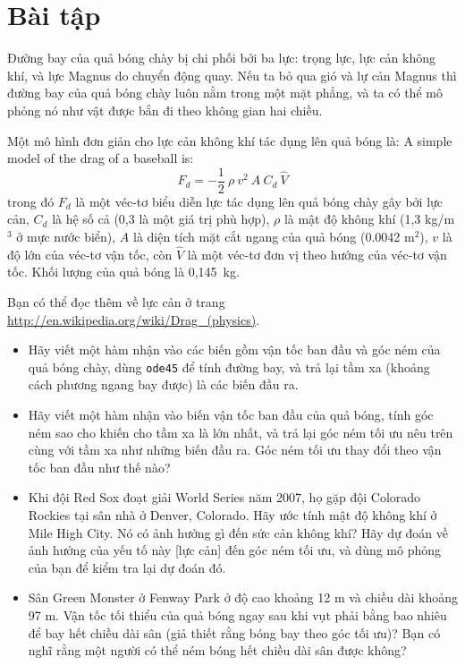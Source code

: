 \documentclass[12pt]{book}
\begin{document}
\section{Bài tập}

\begin{ex}
\label{baseball}

Đường bay của quả bóng chày bị chi phối bởi ba lực: trọng lực,
lực cản không khí, và lực Magnus do chuyển động quay. Nếu ta
bỏ qua gió và lự cản Magnus thì đường bay của quả bóng chày
luôn nằm trong một mặt phẳng, và ta có thể mô phỏng nó như
vật được bắn đi theo không gian hai chiều.

Một mô hình đơn giản cho lực cản không khí tác dụng lên quả bóng là:
A simple model of the drag of a baseball is:
%
\[ F_d = -\frac{1}{2} ~ \rho ~ v^2 ~ A ~ C_d ~ \hat{V}   \]
%
trong đó $F_d$ là một véc-tơ biểu diễn lực tác dụng lên quả bóng 
chày gây bởi lực cản, $C_d$ là hệ số cả (0,3 là một giá trị phù hợp),
$\rho$ là mật độ không khí (1,3 kg/m$^3$ ở mực nước biển), $A$
là diện tích mặt cắt ngang của quả bóng (0.0042 m$^2$), $v$ là
độ lớn của véc-tơ vận tốc, còn $\hat{V}$ là một véc-tơ đơn vị
theo hướng của véc-tơ vận tốc. Khối lượng của quả bóng là 
0,145~kg.

Bạn có thể đọc thêm về lực cản ở trang 
\url{http://en.wikipedia.org/wiki/Drag_(physics)}.

\begin{itemize}

\item Hãy viết một hàm nhận vào các biến gồm vận tốc ban đầu và góc ném của
quả bóng chày, dùng {\tt ode45} để tính đường bay, và trả lại tầm xa (khoảng
cách phương ngang bay được) là các biến đầu ra.

\item Hãy viết một hàm nhận vào biến vận tốc ban đầu của quả bóng, tính
góc ném sao cho khiến cho tầm xa là lớn nhất, và trả lại góc ném tối ưu nêu
trên cùng với tầm xa như những biến đầu ra. Góc ném tối ưu thay đổi theo
vận tốc ban đầu như thế nào?

\item Khi đội Red Sox đoạt giải World Series năm 2007, họ gặp đội
Colorado Rockies tại sân nhà ở Denver, Colorado.  Hãy ước tính mật độ
không khí ở Mile High City. Nó có ảnh hưởng gì đến sức cản không khí?
Hãy dự đoán về ảnh hưởng của yếu tố này [lực cản] đến góc ném tối ưu,
và dùng mô phỏng của bạn để kiểm tra lại dự đoán đó.

\item Sân Green Monster ở Fenway Park ở độ cao khoảng 12 m và 
chiều dài khoảng 97 m. Vận tốc tối thiểu của quả bóng ngay sau khi
vụt phải bằng bao nhiêu để bay hết chiều dài sân (giả thiết rằng 
bóng bay theo góc tối ưu)? Bạn có nghĩ rằng một người có thể
ném bóng hết chiều dài sân được không?


\end{itemize}
\end{ex}
\end{document}
